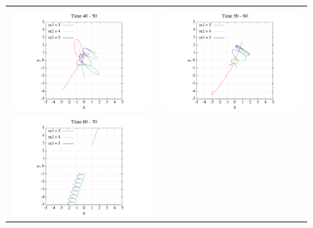 \documentclass[11pt,a4paper,oneside,onecolumn]{jarticle}
\begin{document}
\begin{figure}[H]
\begin{tabular}{cc}
\begin{minipage}[t]{0.45\hsize}
\end{minipage}\\
%
\begin{minipage}[t]{0.45\hsize}
\centering
\includegraphics[width=8cm]{./image/pythagoras_orbit_40to50.pdf}
\end{minipage} &
\begin{minipage}[t]{0.45\hsize}
\centering
\includegraphics[width=8cm]{./image/pythagoras_orbit_50to60.pdf}
\end{minipage}\\
%
\begin{minipage}[t]{0.45\hsize}
\centering
\includegraphics[width=8cm]{./image/pythagoras_orbit_60to70.pdf}
\end{minipage}
\end{tabular}
\caption{\label{}}
\end{figure}
\end{document}
